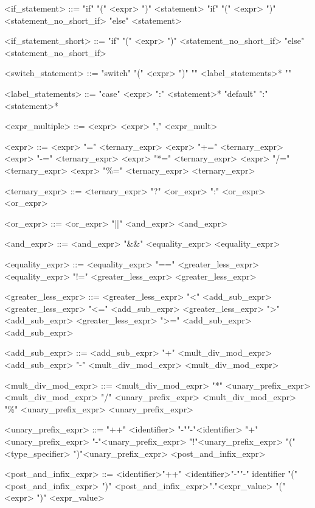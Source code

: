 \begin{grammar}
 <if\_statement> ::= "if" "(" <expr> ")" <statement>
 \alt "if" "(" <expr> ")" <statement\_no\_short\_if> "else" <statement>
 
 <if\_statement\_short> ::= "if" "(" <expr> ")" <statement\_no\_short\_if> "else" <statement\_no\_short\_if>
 
 <switch\_statement> ::= "switch" "(" <expr> ")" "{" <label\_statements>* "}"
 
 <label\_statements> ::= "case" <expr> ":" <statement>*
 \alt "default" ":" <statement>*
 
 <expr\_multiple> ::= <expr>
 \alt <expr> "," <expr_mult>
 
 <expr> ::= <expr> "=" <ternary\_expr>
 \alt <expr> "+=" <ternary\_expr>
 \alt <expr> "-=" <ternary\_expr>
 \alt <expr> "*=" <ternary\_expr>
 \alt <expr> "/=" <ternary\_expr>
 \alt <expr> "\%=" <ternary\_expr>
 \alt <ternary\_expr>
 
 <ternary\_expr> ::= <ternary\_expr> "?" <or\_expr> ":" <or\_expr>
 \alt <or\_expr>
 
 <or\_expr> ::= <or\_expr> "||" <and\_expr>
 \alt <and\_expr>
 
 <and\_expr> ::= <and\_expr> "&&" <equality\_expr>
 \alt <equality\_expr>
 
 <equality\_expr> ::= <equality\_expr> "==" <greater\_less\_expr>
 \alt <equality\_expr> "!=" <greater\_less\_expr>
 \alt <greater\_less\_expr>
 
 <greater\_less\_expr> ::= <greater\_less\_expr> "<" <add\_sub\_expr>
 \alt <greater\_less\_expr> "<=" <add\_sub\_expr>
 \alt <greater\_less\_expr> ">" <add\_sub\_expr>
 \alt <greater\_less\_expr> ">=" <add\_sub\_expr>
 \alt <add\_sub\_expr>
 
 <add\_sub\_expr> ::= <add\_sub\_expr> "+" <mult\_div\_mod\_expr>
 \alt <add\_sub\_expr> "-" <mult\_div\_mod\_expr>
 \alt <mult\_div\_mod\_expr>
 
 <mult\_div\_mod\_expr> ::= <mult\_div\_mod\_expr> "*" <unary\_prefix\_expr>
 \alt <mult\_div\_mod\_expr> "/" <unary\_prefix\_expr>
 \alt <mult\_div\_mod\_expr> "\%" <unary\_prefix\_expr>
 \alt <unary\_prefix\_expr>
 
 <unary\_prefix\_expr> ::= "++" <identifier>
 \alt "-""-"<identifier>
 \alt "+"<unary\_prefix\_expr>
 \alt "-"<unary\_prefix\_expr>
 \alt "!"<unary\_prefix\_expr>
 \alt "(" <type\_specifier> ")"<unary\_prefix\_expr>
 \alt <post\_and\_infix\_expr>
 
 <post\_and\_infix\_expr> ::= <identifier>"++"
 \alt <identifier>"-""-"
 \alt identifier "(" <post\_and\_infix\_expr> ")"
 \alt <post\_and\_infix\_expr>"."<expr\_value>
 \alt "(" <expr> ")"
 \alt <expr\_value>
 

\end{grammar}
